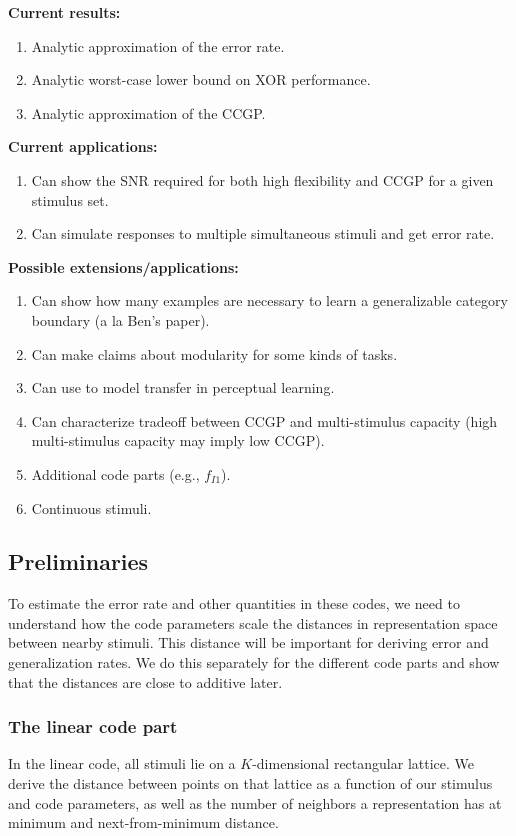 \documentclass[letter,12pt]{article}
\begin{document}
\textbf{Current results:}
\begin{enumerate}
\item Analytic approximation of the error rate.
\item Analytic worst-case lower bound on XOR performance.
\item Analytic approximation of the CCGP.
\end{enumerate}

\textbf{Current applications:}
\begin{enumerate}
\item Can show the SNR required for both high flexibility and CCGP for a
  given stimulus set.
\item Can simulate responses to multiple simultaneous stimuli and get error
  rate. 
\end{enumerate}

\textbf{Possible extensions/applications:}
\begin{enumerate}
\item Can show how many examples are necessary to learn a generalizable category
  boundary (a la Ben's paper).
\item Can make claims about modularity for some kinds of tasks. 
\item Can use to model transfer in perceptual learning.
\item Can characterize tradeoff between CCGP and multi-stimulus capacity
  (high multi-stimulus capacity may imply low CCGP). 
\item Additional code parts (e.g., $f_{I1}$).
\item Continuous stimuli.
\end{enumerate}

\subsection{Preliminaries}
To estimate the error rate and other quantities in these codes, we need to
understand how the code parameters scale the distances in representation space
between nearby stimuli. This distance will be important for deriving error and
generalization rates. We do this separately for the different code parts and
show that the distances are close to additive later.

\subsubsection{The linear code part}
In the linear code, all stimuli lie on a $K$-dimensional rectangular lattice.
We derive the distance between points on that lattice as a function of our
stimulus and code parameters, as well as the number of neighbors a
representation has at minimum and next-from-minimum distance.
\end{document}
